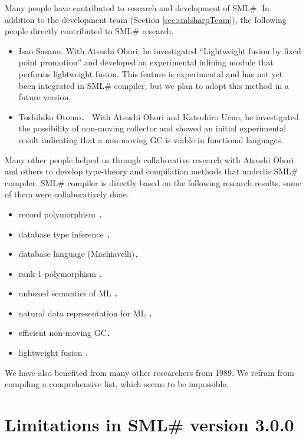 \documentclass{jbook}
\newcommand{\txt}[2]{#2}
\newcommand{\smlsharp}{SML\#}
\newcommand{\version}{3.0.0}
\begin{document}
	Many people have contributed to research and development of
\smlsharp{}.
	In addition to the development team (Section
\ref{sec:smlsharpTeam}), the following people directly contributed to 
\smlsharp{} research.
\begin{itemize}
\item Isao Sasano.
With Atsushi Ohori, he investigated 
``Lightweight fusion by fixed point promotion'' and 
developed an experimental inlining module that performs lightweight
fusion.
	This feature is experimental and has not yet been integrated in
\smlsharp{} compiler, but we plan to adopt this method in a future
version.
\item Toshihiko Otomo．
	With Atsushi Ohori and Katsuhiro Ueno, he investigated the
possibility of non-moving collector and showed an initial experimental
result indicating that a non-moving GC is viable in functional
languages.
\end{itemize}
	Many other people helped us through collaborative research with
Atsushi Ohori and others to develop type-theory and compilation methods
that underlie \smlsharp{} compiler.
	\smlsharp{} compiler is directly based on the
following research results, some of them were collaboratively done.
\begin{itemize}
\item record polymorphism \cite{ohor92popl,ohor95toplas}．
\item database type inference \cite{ohor88lfp}．
\item database language (Machiavelli)\cite{ohor89sigmod,bune96tods}．
\item rank-1 polymorphism \cite{ohor99icfp}．
\item unboxed semantics of ML \cite{ohor97unbox}．
\item natural data representation for ML \cite{nguyen06ppdp}．
\item efficient non-moving GC\cite{ueno11icfp}．
\item lightweight fusion \cite{ohor07popl}.
\end{itemize}
	We have also benefited from many other researchers from 1989.
	We refrain from compiling a comprehensive list, which seems to
be impossible. 
\fi%

\section{
\txt{\smlsharp{}第\version{}版の機能と制限}
{Limitations in \smlsharp{} version \version{}}
}
\label{sec:smlsharpLimitation}
\end{document}
